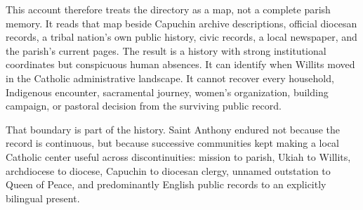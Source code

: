 This account therefore treats the directory as a map, not a complete parish memory. It reads that map beside Capuchin archive descriptions, official diocesan records, a tribal nation's own public history, civic records, a local newspaper, and the parish's current pages. The result is a history with strong institutional coordinates but conspicuous human absences. It can identify when Willits moved in the Catholic administrative landscape. It cannot recover every household, Indigenous encounter, sacramental journey, women's organization, building campaign, or pastoral decision from the surviving public record.

That boundary is part of the history. Saint Anthony endured not because the record is continuous, but because successive communities kept making a local Catholic center useful across discontinuities: mission to parish, Ukiah to Willits, archdiocese to diocese, Capuchin to diocesan clergy, unnamed outstation to Queen of Peace, and predominantly English public records to an explicitly bilingual present.
